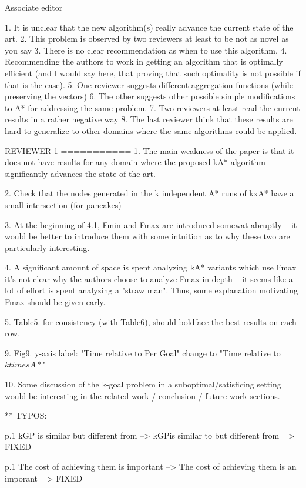 Associate editor
===============

1. It is unclear that the new algorithm(s) really advance the current state of the art. 
2. This problem is observed by two reviewers at least to be not as novel as you say
3. There is no clear recommendation as when to use this algorithm. 
4. Recommending the authors to work in getting an algorithm that is optimally efficient (and I would say here, that proving that such optimality is not possible if that is the case).
5. One reviewer suggests different aggregation functions (while preserving the vectors)
6. The other suggests other possible simple modifications to A* for addressing the same problem.
7. Two reviewers at least read the current results in a rather negative way
8. The last reviewer think that these results are hard to generalize to other domains where the same algorithms could be applied.

 
REVIEWER 1
===========
1. The main weakness of the paper is that it does not have results for any domain where the proposed kA* algorithm significantly advances the state of the art.

2. Check that the nodes generated in the k independent A* runs of kxA* have a small intersection (for pancakes)

3. At the beginning of 4.1, Fmin and Fmax are introduced somewat abruptly
-- it would be better to introduce them with some intuition as to why
these two are particularly interesting.

4. A significant amount of space is spent analyzing kA* variants which 
use Fmax it's not clear why the authors choose to analyze Fmax in depth -- it
seems like a lot of effort is spent analyzing a "straw man".
 Thus, some explanation motivating Fmax should be given early.

5. Table5. for consistency (with Table6), should boldface the best
results on each row.

9. Fig9. y-axis label: "Time relative to Per Goal"  change to "Time relative to $k times A*$"

10. Some discussion of the k-goal problem in a suboptimal/satisficing setting would be interesting in the related work / conclusion / future work sections. 

** TYPOS:

p.1 kGP is similar but different from --> kGPis similar to but
different from   => FIXED

p.1 The cost of achieving them is important --> The cost of
achieving them is an imporant => FIXED 

